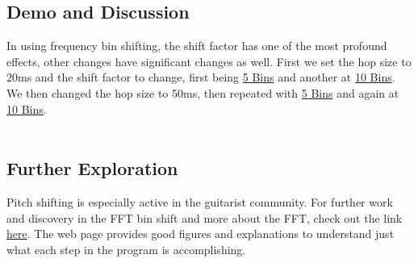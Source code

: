 \subsection{Demo and Discussion}
In using frequency bin shifting, the shift factor has one of the most profound effects, other changes have significant changes as well. First we set the hop size to 20ms and the shift factor to change, first being
\href{run:../OutputAudio/FreqBinShift_22-001 Original Vocal_{N=20ms}{h=0.5}{s=5}}{5 Bins}
and another at
\href{run:../OutputAudio/FreqBinShift_22-001 Original Vocal_{N=20ms}{h=0.5}{s=10}}{10 Bins}.
We then changed the hop size to 50ms, then repeated with 
\href{run:../OutputAudio/FreqBinShift_22-001 Original Vocal_{N=50ms}{h=0.5}{s=5}}{5 Bins}
and again at
\href{run:../OutputAudio/FreqBinShift_22-001 Original Vocal_{N=50ms}{h=0.5}{s=10}}{10 Bins}.
\\ \\


\subsection{Further Exploration}
Pitch shifting is especially active in the guitarist community. For further work and discovery in the FFT bin shift and more about the FFT, check out the link 
\href{http://www.guitarpitchshifter.com/algorithm.html}{here}. 
The web page provides good figures and explanations to understand just what each step in the program is accomplishing.
